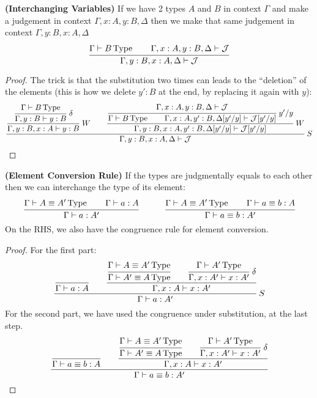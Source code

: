\begin{lemma}{\textbf{(Interchanging Variables)}}
    If we have 2 types $A$ and $B$ in context $\Gamma$ and make a judgement in context $\Gamma,x:A,y:B,\Delta$ then we make that same judgement in context $\Gamma,y:B,x:A,\Delta$
    \begin{equation*}
        \cfrac{\Gamma\vdash B\operatorname{Type}  \qquad \Gamma,x:A,y:B,\Delta\vdash\mathcal{J}}{\Gamma,y:B,x:A,\Delta\vdash\mathcal{J}}
    \end{equation*}
\end{lemma}
\begin{dem}
\begin{proof}
    The trick is that the substitution two times can leads to the ``deletion'' of the elements (this is how we delete $y':B$ at the end, by replacing it again with $y$):
    \begin{equation*}
        \cfrac{\cfrac{\cfrac{\Gamma\vdash B\type }{\Gamma,y:B\vdash y:B}\ \delta}{\Gamma,y:B,x:A\vdash y:B} \ W \qquad\cfrac{\cfrac{\Gamma,x:A,y:B,\Delta\vdash\mathcal{J}}{\Gamma\vdash B\type \qquad\Gamma,x:A,y':B,\Delta[y'/y]\vdash\mathcal{J}[y'/y]}\ y'/y}{\Gamma,y:B,x:A,y':B,\Delta[y'/y]\vdash\mathcal{J}[y'/y]} \ W}{\Gamma,y:B,x:A,\Delta\vdash\mathcal{J}} \ S
    \end{equation*}
\end{proof}
\end{dem}

\begin{lemma}{\textbf{(Element Conversion Rule)}}
    \label{lemma:element-conv-rule}
    If the types are judgmentally equals to each other then we can interchange the type of its element:
    \begin{equation*}
        \cfrac{\Gamma\vdash A\equiv A'\operatorname{Type} \qquad\Gamma\vdash a:A}{\Gamma\vdash a:A'} \qquad \quad \cfrac{\Gamma\vdash A\equiv A'\operatorname{Type}\qquad \Gamma\vdash a\equiv b:A}{\Gamma\vdash a\equiv b:A'}
    \end{equation*}
    On the RHS, we also have the congruence rule for element conversion.
\end{lemma}
\begin{dem}
\begin{proof}
    For the first part:
    \begin{equation*}
        \cfrac{\cfrac{}{\Gamma\vdash a:A}  \qquad \cfrac{\cfrac{\Gamma\vdash A\equiv A'\type }{\Gamma\vdash A'\equiv A\type }\qquad \cfrac{\Gamma\vdash A'\type }{\Gamma, x:A'\vdash x:A'}\ \delta}{\Gamma, x:A\vdash x:A'}}{\Gamma\vdash a:A'} \ S
    \end{equation*}
    For the second part, we have used the congruence under substitution, at the last step.
    \begin{equation*}
        \cfrac{\cfrac{}{\Gamma\vdash a\equiv b:A}\qquad \cfrac{\cfrac{\Gamma\vdash A\equiv A'\operatorname{Type}}{\Gamma\vdash A'\equiv A\operatorname{Type}}\qquad\cfrac{\Gamma\vdash A'\operatorname{Type}}{\Gamma, x:A'\vdash x:A'}\ \delta}{\Gamma,x:A\vdash x:A'}}{\Gamma\vdash a\equiv b:A'}
    \end{equation*}
\end{proof}
\end{dem}


